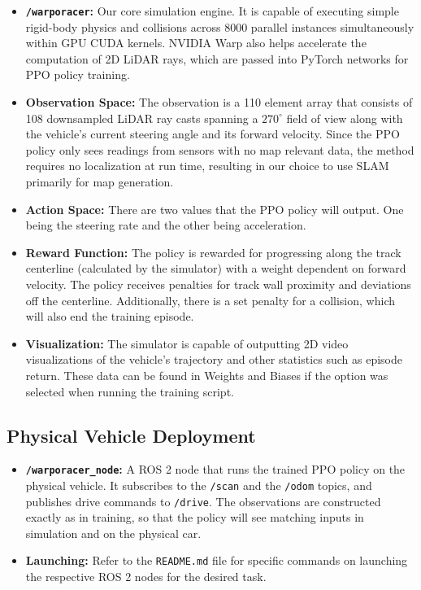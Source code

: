\documentclass[11pt,letterpaper]{article}
\begin{document}
\begin{itemize}
    \item \textbf{\texttt{/warporacer}:} Our core simulation engine. It is capable of executing simple rigid-body physics and collisions across 8000 parallel instances simultaneously 
    within GPU CUDA kernels. NVIDIA Warp also helps accelerate the computation of 2D LiDAR rays, which are passed into PyTorch networks for PPO policy training.
    \item \textbf{Observation Space:} The observation is a 110 element array that consists of 108 downsampled LiDAR ray casts spanning a $270^\circ$ field of view along with the vehicle's current steering angle and its forward velocity.
    Since the PPO policy only sees readings from sensors with no map relevant data, the method requires no localization at run time, resulting in our choice to use SLAM primarily for map generation.
    \item \textbf{Action Space:} There are two values that the PPO policy will output. One being the steering rate and the other being acceleration.
    \item \textbf{Reward Function:} The policy is rewarded for progressing along the track centerline (calculated by the simulator) with a weight dependent on forward velocity. The policy receives
    penalties for track wall proximity and deviations off the centerline. Additionally, there is a set penalty for a collision, which will also end the training episode.
    \item \textbf{Visualization:} The simulator is capable of outputting 2D video visualizations of the vehicle's trajectory and other statistics such as episode return. These data can be found in Weights and Biases if the option was selected when running the training script.
\end{itemize}

\subsection{Physical Vehicle Deployment}
\begin{itemize}
    \item \textbf{\texttt{/warporacer\_node}:} A ROS 2 node that runs the trained PPO policy on the physical vehicle. It subscribes to the \texttt{/scan} and the \texttt{/odom} topics, and publishes drive commands to \texttt{/drive}. 
    The observations are constructed exactly as in training, so that the policy will see matching inputs in simulation and on the physical car.
    \item \textbf{Launching:} Refer to the \texttt{README.md} file for specific commands on launching the respective ROS 2 nodes for the desired task.
\end{itemize}
\end{document}
